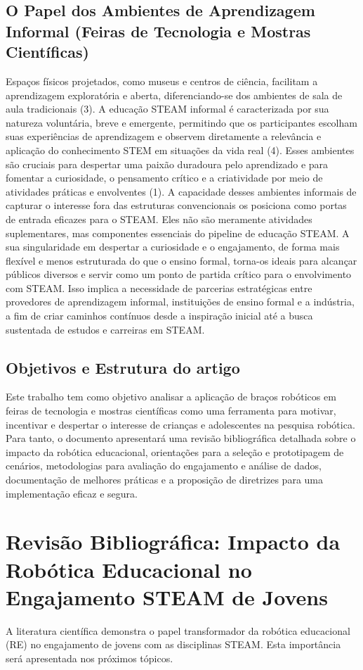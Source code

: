 \documentclass[%
  a4paper,%
  12pt,%
  fleqn,%
  english,%
  brazilian,%
]{article}
\begin{document}
\subsection{O Papel dos Ambientes de Aprendizagem Informal (Feiras de Tecnologia e Mostras Científicas)}

Espaços físicos projetados, como museus e centros de ciência, facilitam a aprendizagem exploratória e aberta, diferenciando-se dos ambientes de sala de aula tradicionais (3). A educação STEAM informal é caracterizada por sua natureza voluntária, breve e emergente, permitindo que os participantes escolham suas experiências de aprendizagem e observem diretamente a relevância e aplicação do conhecimento STEM em situações da vida real (4). Esses ambientes são cruciais para despertar uma paixão duradoura pelo aprendizado e para fomentar a curiosidade, o pensamento crítico e a criatividade por meio de atividades práticas e envolventes (1).
A capacidade desses ambientes informais de capturar o interesse fora das estruturas convencionais os posiciona como portas de entrada eficazes para o STEAM. Eles não são meramente atividades suplementares, mas componentes essenciais do pipeline de educação STEAM. A sua singularidade em despertar a curiosidade e o engajamento, de forma mais flexível e menos estruturada do que o ensino formal, torna-os ideais para alcançar públicos diversos e servir como um ponto de partida crítico para o envolvimento com STEAM. Isso implica a necessidade de parcerias estratégicas entre provedores de aprendizagem informal, instituições de ensino formal e a indústria, a fim de criar caminhos contínuos desde a inspiração inicial até a busca sustentada de estudos e carreiras em STEAM.


\subsection{Objetivos e Estrutura do artigo}
Este trabalho tem como objetivo analisar a aplicação de braços robóticos em feiras de tecnologia e mostras científicas como uma ferramenta para motivar, incentivar e despertar o interesse de crianças e adolescentes na pesquisa robótica. Para tanto, o documento apresentará uma revisão bibliográfica detalhada sobre o impacto da robótica educacional, orientações para a seleção e prototipagem de cenários, metodologias para avaliação do engajamento e análise de dados, documentação de melhores práticas e a proposição de diretrizes para uma implementação eficaz e segura.


\section{Revisão Bibliográfica: Impacto da Robótica Educacional no Engajamento STEAM de Jovens}
A literatura científica demonstra o papel transformador da robótica educacional (RE) no engajamento de jovens com as disciplinas STEAM. Esta importância será apresentada nos próximos tópicos.
\end{document}
